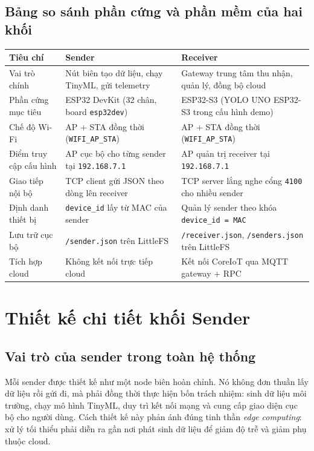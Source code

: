 \documentclass[12pt,a4paper]{report}
\begin{document}
\subsection{Bảng so sánh phần cứng và phần mềm của hai khối}
\begin{longtable}{p{}p{}p{}}
\toprule
Tiêu chí & Sender & Receiver \\
\midrule
\endhead
Vai trò chính & Nút biên tạo dữ liệu, chạy TinyML, gửi telemetry & Gateway trung tâm thu nhận, quản lý, đồng bộ cloud \\
Phần cứng mục tiêu & ESP32 DevKit (32 chân, board \texttt{esp32dev}) & ESP32-S3 (YOLO UNO ESP32-S3 trong cấu hình demo) \\
Chế độ Wi-Fi & AP + STA đồng thời (\texttt{WIFI\_AP\_STA}) & AP + STA đồng thời (\texttt{WIFI\_AP\_STA}) \\
Điểm truy cập cấu hình & AP cục bộ cho từng sender tại \texttt{192.168.7.1} & AP quản trị receiver tại \texttt{192.168.7.1} \\
Giao tiếp nội bộ & TCP client gửi JSON theo dòng lên receiver & TCP server lắng nghe cổng \texttt{4100} cho nhiều sender \\
Định danh thiết bị & \texttt{device\_id} lấy từ MAC của sender & Quản lý sender theo khóa \texttt{device\_id = MAC} \\
Lưu trữ cục bộ & \texttt{/sender.json} trên LittleFS & \texttt{/receiver.json}, \texttt{/senders.json} trên LittleFS \\
Tích hợp cloud & Không kết nối trực tiếp cloud & Kết nối CoreIoT qua MQTT gateway + RPC \\
\bottomrule
\end{longtable}

\section{Thiết kế chi tiết khối Sender}

\subsection{Vai trò của sender trong toàn hệ thống}
Mỗi sender được thiết kế như một node biên hoàn chỉnh. Nó không đơn thuần lấy dữ liệu rồi gửi đi, mà phải đồng thời thực hiện bốn trách nhiệm: sinh dữ liệu môi trường, chạy mô hình TinyML, duy trì kết nối mạng và cung cấp giao diện cục bộ cho người dùng. Cách thiết kế này phản ánh đúng tinh thần \textit{edge computing}: xử lý tối thiểu phải diễn ra gần nơi phát sinh dữ liệu để giảm độ trễ và giảm phụ thuộc cloud.
\end{document}
